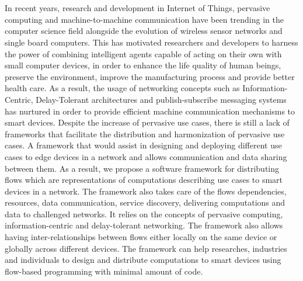 \chapter{\abstractname}
In recent years, research and development in Internet of Things, pervasive computing and machine-to-machine communication have been trending in the computer science field alongside the evolution of wireless sensor networks and single board computers. 
This has  motivated researchers and developers to harness the power of combining intelligent agents capable of acting on their own with small computer devices, in order to enhance the  life quality of human beings, preserve the environment, improve the manufacturing  process and provide better health care. As a result, the usage of networking concepts such as Information-Centric, Delay-Tolerant architectures and publish-subscribe messaging systems has nurtured in order to provide efficient machine communication mechanisms to smart devices. Despite the increase of pervasive use cases, there is still a lack of frameworks that facilitate the distribution and harmonization of pervasive use cases. A framework that would assist in designing and deploying different use cases to edge devices in a network and allows communication and data sharing between them.  As a result, we propose a software framework for distributing flows which are representations of computations describing use cases to smart devices in a network. The framework also takes care of the flows dependencies, resources, data communication, service discovery, delivering computations and data to challenged networks. It relies on the concepts of pervasive computing, information-centric and delay-tolerant networking. The framework also allows having inter-relationships between flows either locally on the same device or globally across different devices. The framework can help researches, industries and individuals to design and distribute computations to smart devices using flow-based programming with minimal amount of code.